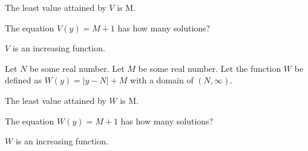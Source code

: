 \documentclass{ximera}
\begin{document}
\begin{exercise}
The least value attained by $V$ is M.

\begin{multipleChoice}
\end{multipleChoice}

\end{exercise}



\begin{exercise}
The equation $V(y) = M+1$ has how many solutions?

\begin{selectAll}
\end{selectAll}

\end{exercise}


\begin{exercise}
$V$ is an increasing function.

\begin{multipleChoice}
\end{multipleChoice}

\end{exercise}




\begin{definition}
Let $N$ be some real number.
Let $M$ be some real number.
Let the function $W$ be defined as $W(y) = |y-N|+M$ with a domain of $(N, \infty)$. 

\end{definition}



\begin{exercise}
The least value attained by $W$ is M.

\begin{multipleChoice}
\end{multipleChoice}

\end{exercise}



\begin{exercise}
The equation $W(y) = M+1$ has how many solutions?

\begin{selectAll}
\end{selectAll}

\end{exercise}


\begin{exercise}
$W$ is an increasing function.

\begin{multipleChoice}
\end{multipleChoice}

\end{exercise}
\end{document}
